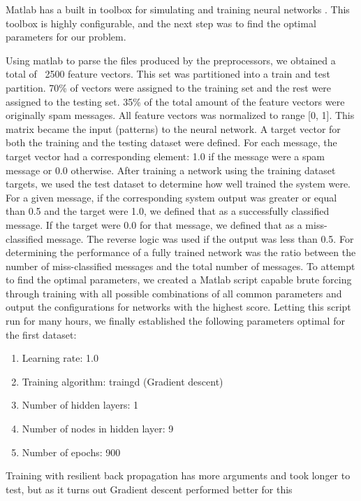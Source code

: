     Matlab has a built in toolbox for simulating and training neural networks
    \cite{matlab-nn}. 
    This toolbox is highly configurable, and the next step was to find the
    optimal parameters for our problem.
    
    Using matlab to parse the files produced by the preprocessors, we obtained
    a total of ~2500 feature vectors. This set was partitioned into a train and
    test partition. 70\% of vectors were assigned to the training set and the
    rest were assigned to the testing set. 35\% of the total amount of the
    feature vectors were originally spam messages. All feature vectors was
    normalized to range [0, 1]. This matrix became the input (patterns) to the
    neural network. A target vector for both the training and the testing
    dataset were defined. For each message, the target vector had a
    corresponding element: 1.0 if the message were a spam message or 0.0
    otherwise. 
    After training a network using the training dataset targets, we used the
    test dataset to determine how well trained the system were. 
    For a given message, if the corresponding system output was greater or
    equal than 0.5 and the target were 1.0, we defined that as a successfully
    classified message. If the target were 0.0 for that message, we defined
    that as a miss-classified message. The reverse logic was used if the output
    was less than 0.5.
    For determining the performance of a fully trained network was the ratio
    between the number of miss-classified messages and the total number of
    messages.
    To attempt to find the optimal parameters, we created a Matlab script
    capable brute forcing through training with all possible combinations of
    all common parameters and output the configurations for networks with the
    highest score.  Letting this script run for many hours, we finally
    established the following parameters optimal for the first dataset:
    \begin{enumerate}
      \item Learning rate: 1.0
      \item Training algorithm: traingd (Gradient descent)
      \item Number of hidden layers: 1
      \item Number of nodes in hidden layer: 9
      \item Number of epochs: 900
    \end{enumerate}
    Training with resilient back propagation has more arguments and took longer
    to test, but as it turns out Gradient descent performed better for this
